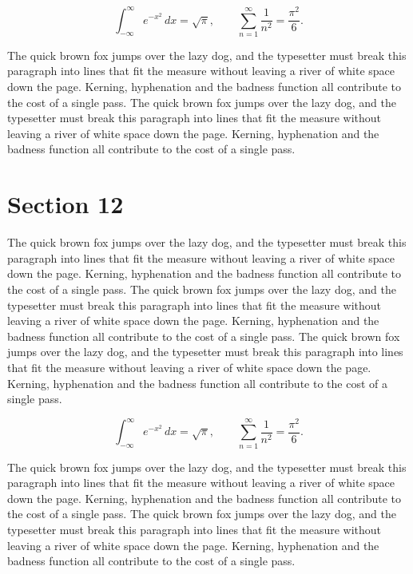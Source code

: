 \documentclass{article}
\begin{document}
\begin{equation}
\int_{-\infty}^{\infty} e^{-x^{2}}\,dx = \sqrt{\pi}, \qquad
\sum_{n=1}^{\infty} \frac{1}{n^{2}} = \frac{\pi^{2}}{6}.
\end{equation}

The quick brown fox jumps over the lazy dog, and the typesetter must break this paragraph into lines that fit the measure without leaving a river of white space down the page. Kerning, hyphenation and the badness function all contribute to the cost of a single pass. The quick brown fox jumps over the lazy dog, and the typesetter must break this paragraph into lines that fit the measure without leaving a river of white space down the page. Kerning, hyphenation and the badness function all contribute to the cost of a single pass. 
\section{Section 12}
The quick brown fox jumps over the lazy dog, and the typesetter must break this paragraph into lines that fit the measure without leaving a river of white space down the page. Kerning, hyphenation and the badness function all contribute to the cost of a single pass. The quick brown fox jumps over the lazy dog, and the typesetter must break this paragraph into lines that fit the measure without leaving a river of white space down the page. Kerning, hyphenation and the badness function all contribute to the cost of a single pass. The quick brown fox jumps over the lazy dog, and the typesetter must break this paragraph into lines that fit the measure without leaving a river of white space down the page. Kerning, hyphenation and the badness function all contribute to the cost of a single pass. 

\begin{equation}
\int_{-\infty}^{\infty} e^{-x^{2}}\,dx = \sqrt{\pi}, \qquad
\sum_{n=1}^{\infty} \frac{1}{n^{2}} = \frac{\pi^{2}}{6}.
\end{equation}

The quick brown fox jumps over the lazy dog, and the typesetter must break this paragraph into lines that fit the measure without leaving a river of white space down the page. Kerning, hyphenation and the badness function all contribute to the cost of a single pass. The quick brown fox jumps over the lazy dog, and the typesetter must break this paragraph into lines that fit the measure without leaving a river of white space down the page. Kerning, hyphenation and the badness function all contribute to the cost of a single pass. 
\end{document}
